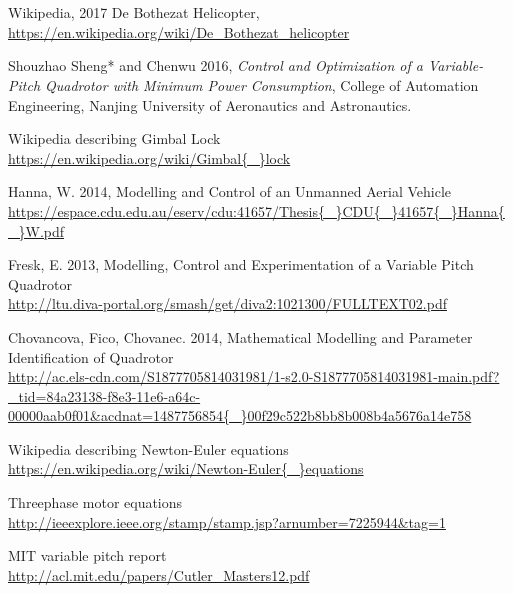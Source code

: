 \section *  {}

\begin{thebibliography}{9}

Wikipedia, 2017 De Bothezat Helicopter, \\
\url{https://en.wikipedia.org/wiki/De_Bothezat_helicopter}


Shouzhao Sheng* and Chenwu 2016,      %
\textit{Control and Optimization of a Variable-Pitch
Quadrotor with Minimum Power Consumption},   %
College of Automation Engineering, Nanjing University of Aeronautics and Astronautics.
        
        Wikipedia describing Gimbal Lock \\ 
\url{https://en.wikipedia.org/wiki/Gimbal{\_}lock}

        Hanna, W. 2014, Modelling and Control of an Unmanned Aerial Vehicle \\ 
\url{https://espace.cdu.edu.au/eserv/cdu:41657/Thesis{\_}CDU{\_}41657{\_}Hanna{\_}W.pdf}

        Fresk, E. 2013, Modelling, Control and Experimentation of a Variable Pitch Quadrotor \\ 
\url{http://ltu.diva-portal.org/smash/get/diva2:1021300/FULLTEXT02.pdf}

        Chovancova, Fico, Chovanec. 2014, Mathematical Modelling and Parameter Identification of Quadrotor \\ 
\url{http://ac.els-cdn.com/S1877705814031981/1-s2.0-S1877705814031981-main.pdf?_tid=84a23138-f8e3-11e6-a64c-00000aab0f01&acdnat=1487756854{\_}00f29c522b8bb8b008b4a5676a14e758}

        Wikipedia describing Newton-Euler equations \\ 
\url{https://en.wikipedia.org/wiki/Newton-Euler{\_}equations}

    Threephase motor equations \\
\url{http://ieeexplore.ieee.org/stamp/stamp.jsp?arnumber=7225944&tag=1}

    MIT variable pitch report \\
\url{http://acl.mit.edu/papers/Cutler_Masters12.pdf}


\end{thebibliography}
